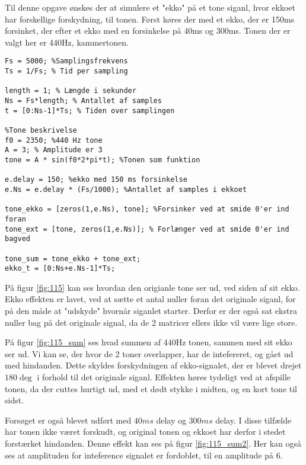 \documentclass[../main.tex]{subfiles}
\begin{document}
Til denne opgave ønskes der at simulere et "ekko" på et tone siganl, hvor ekkoet har forskellige forskydning, til tonen. Først køres der med et ekko, der er 150ms forsinket, der efter et ekko med en forsinkelse på 40ms og 300ms. Tonen der er valgt her er 440Hz, kammertonen.

\begin{lstlisting}[caption={Kode til opgave 1.15}, label=lst:115]
Fs = 5000; %Samplingsfrekvens
Ts = 1/Fs; % Tid per sampling

length = 1; % Længde i sekunder
Ns = Fs*length; % Antallet af samples
t = [0:Ns-1]*Ts; % Tiden over samplingen

%Tone beskrivelse
f0 = 2350; %440 Hz tone
A = 3; % Amplitude er 3
tone = A * sin(f0*2*pi*t); %Tonen som funktion

e.delay = 150; %ekko med 150 ms forsinkelse
e.Ns = e.delay * (Fs/1000); %Antallet af samples i ekkoet

tone_ekko = [zeros(1,e.Ns), tone]; %Forsinker ved at smide 0'er ind foran
tone_ext = [tone, zeros(1,e.Ns)]; % Forlænger ved at smide 0'er ind bagved

tone_sum = tone_ekko + tone_ext;
ekko_t = [0:Ns+e.Ns-1]*Ts;
\end{lstlisting}


På figur \ref{fig:115} kan ses hvordan den origianle tone ser ud, ved siden af sit ekko. Ekko effekten er lavet, ved at sætte et antal nuller foran det originale siganl, for på den måde at "udskyde" hvornår siganlet starter. Derfor er der også sat ekstra nuller bag på det originale signal, da de 2 matricer ellers ikke vil være lige store. 


På figur \ref{fig:115_sum} ses hvad summen af 440Hz tonen, sammen med sit ekko ser ud. Vi kan se, der hvor de 2 toner overlapper, har de intefereret, og gået ud med hindanden. Dette skyldes forskydningen af ekko-signalet, der er blevet drejet \(180\deg\) i forhold til det originale siganl. Effekten høres tydeligt ved at afspille tonen, da der cuttes hurtigt ud, med et dødt stykke i midten, og en kort tone til sidst.

Forsøget er også blevet udført med \(40ms\) delay og \(300ms\) delay. I disse tilfælde har tonen ikke været forskudt, og original tonen og ekkoet har derfor i stedet forstærket hindanden. Denne effekt kan ses på figur \ref{fig:115_sum2}. Her kan også ses at amplituden for inteference signalet er fordoblet, til en amplitude på 6.

\end{document}
